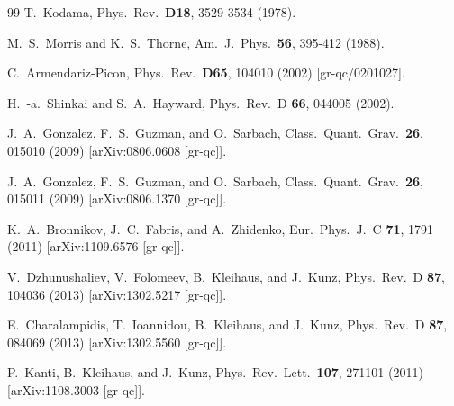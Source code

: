 \documentclass[showpacs,preprintnumbers,amsmath,amssymb,floatfix]{revtex4}
\begin{document}
\begin{thebibliography}{99}
  T.~Kodama,
  Phys.\ Rev.\  {\bf D18}, 3529-3534 (1978).

  M.~S.~Morris and K.~S.~Thorne,
  Am.\ J.\ Phys.\  {\bf 56}, 395-412 (1988).


  C.~Armendariz-Picon,
  Phys.\ Rev.\  {\bf D65}, 104010 (2002)
  [gr-qc/0201027].

  H.~-a.~Shinkai and S.~A.~Hayward,
  Phys.\ Rev.\ D {\bf 66}, 044005 (2002).

  J.~A.~Gonzalez, F.~S.~Guzman, and O.~Sarbach,
  Class.\ Quant.\ Grav.\  {\bf 26}, 015010 (2009)
  [arXiv:0806.0608 [gr-qc]].


  J.~A.~Gonzalez, F.~S.~Guzman, and O.~Sarbach,
  Class.\ Quant.\ Grav.\  {\bf 26}, 015011 (2009)
  [arXiv:0806.1370 [gr-qc]].

  K.~A.~Bronnikov, J.~C.~Fabris, and A.~Zhidenko,
  Eur.\ Phys.\ J.\ C {\bf 71}, 1791 (2011)
  [arXiv:1109.6576 [gr-qc]].

  V.~Dzhunushaliev, V.~Folomeev, B.~Kleihaus, and J.~Kunz,
  Phys.\ Rev.\ D {\bf 87}, 104036 (2013)
  [arXiv:1302.5217 [gr-qc]].

  E.~Charalampidis, T.~Ioannidou, B.~Kleihaus, and J.~Kunz,
  Phys.\ Rev.\ D {\bf 87}, 084069 (2013)
  [arXiv:1302.5560 [gr-qc]].

  P.~Kanti, B.~Kleihaus, and J.~Kunz,
  Phys.\ Rev.\ Lett.\  {\bf 107}, 271101 (2011)
  [arXiv:1108.3003 [gr-qc]].


\end{thebibliography}
\end{document}
